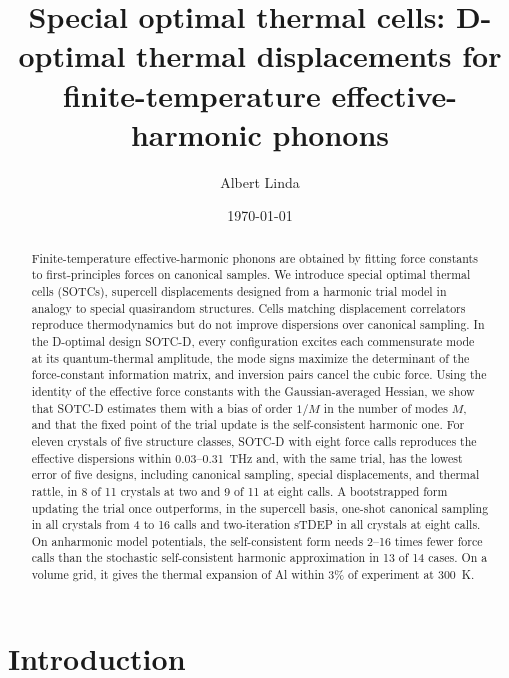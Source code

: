 \documentclass[aip,jap,reprint,amsmath,amssymb,floatfix]{revtex4-2}
\begin{document}

\title{Special optimal thermal cells: D-optimal thermal displacements for
finite-temperature effective-harmonic phonons}

\author{Albert Linda}

\date{\today}

\begin{abstract}
Finite-temperature effective-harmonic phonons are obtained by fitting force
constants to first-principles forces on canonical samples. We introduce
special optimal thermal cells (SOTCs), supercell displacements designed from
a harmonic trial model in analogy to special quasirandom structures. Cells
matching displacement correlators reproduce thermodynamics but do
not improve dispersions over canonical sampling. In the D-optimal design
SOTC-D, every configuration excites each commensurate mode at its
quantum-thermal amplitude, the mode signs maximize the determinant of the
force-constant information matrix, and inversion pairs cancel the cubic
force. Using the identity of the effective force constants with the
Gaussian-averaged Hessian, we show that SOTC-D estimates them with a bias of
order $1/M$ in the number of modes $M$, and that the fixed point of the
trial update is the self-consistent harmonic one. For eleven crystals of
five structure classes, SOTC-D with eight force calls reproduces the
effective dispersions within 0.03--0.31~THz and, with the same trial, has the
lowest error of five designs, including canonical sampling, special
displacements, and thermal rattle, in 8 of 11 crystals at two and 9 of 11 at
eight calls. A bootstrapped form updating the trial once outperforms,
in the supercell basis, one-shot canonical sampling in all crystals from 4
to 16 calls and two-iteration sTDEP in all crystals at eight calls. On
anharmonic model potentials, the self-consistent form needs 2--16 times
fewer force calls than the stochastic self-consistent harmonic approximation
in 13 of 14 cases. On a volume grid, it gives the thermal expansion of
Al within 3\% of experiment at 300~K.
\end{abstract}

\maketitle

\section{Introduction}\label{sec:intro}
\end{document}

